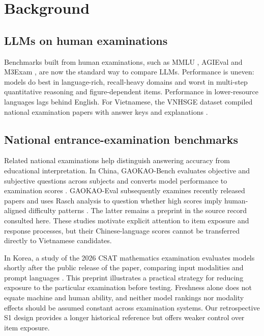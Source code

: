 \documentclass[preprint,12pt,authoryear,nonatbib]{elsarticle}
\begin{document}
\section{Background}
\subsection{LLMs on human examinations}
Benchmarks built from human examinations, such as MMLU \citep{hendrycks2021mmlu}, AGIEval \citep{zhong2024agieval} and M3Exam \citep{zhang2023m3exam}, are now the standard way to compare LLMs. Performance is uneven: models do best in language-rich, recall-heavy domains and worst in multi-step quantitative reasoning and figure-dependent items. Performance in lower-resource languages lags behind English. For Vietnamese, the VNHSGE dataset compiled national examination papers with answer keys and explanations \citep{dao2023vnhsge}.

\subsection{National entrance-examination benchmarks}
Related national examinations help distinguish answering accuracy from educational interpretation. In China, GAOKAO-Bench evaluates objective and subjective questions across subjects and converts model performance to examination scores \citep{zhang2023gaokao}. GAOKAO-Eval subsequently examines recently released papers and uses Rasch analysis to question whether high scores imply human-aligned difficulty patterns \citep{lei2024gaokao}. The latter remains a preprint in the source record consulted here. These studies motivate explicit attention to item exposure and response processes, but their Chinese-language scores cannot be transferred directly to Vietnamese candidates.

In Korea, a study of the 2026 CSAT mathematics examination evaluates models shortly after the public release of the paper, comparing input modalities and prompt languages \citep{pyeon2025csat}. This preprint illustrates a practical strategy for reducing exposure to the particular examination before testing. Freshness alone does not equate machine and human ability, and neither model rankings nor modality effects should be assumed constant across examination systems. Our retrospective S1 design provides a longer historical reference but offers weaker control over item exposure.
\end{document}
